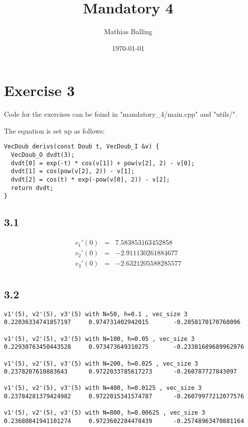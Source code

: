 \documentclass{article}
\title{Mandatory 4}
\author{Mathias Balling}
\date{\today}
\begin{document}
\maketitle

\section*{Exercise 3}
Code for the exercises can be foind in "mandatory\_4/main.cpp" and "utils/".

The equation is set up as follows:
\begin{verbatim}
VecDoub derivs(const Doub t, VecDoub_I &v) {
  VecDoub_O dvdt(3);
  dvdt[0] = exp(-t) * cos(v[1]) + pow(v[2], 2) - v[0];
  dvdt[1] = cos(pow(v[2], 2)) - v[1];
  dvdt[2] = cos(t) * exp(-pow(v[0], 2)) - v[2];
  return dvdt;
}
\end{verbatim}

\subsection*{3.1}
$$\begin{array}{rcl}
  v_1'(0)&=&7.583853163452858\\
  v_2'(0)&=&-2.911130261884677\\
  v_3'(0)&=&-2.6321205588285577\\
\end{array}$$

\subsection*{3.2}
\begin{verbatim}
v1'(5), v2'(5), v3'(5) with N=50, h=0.1 , vec_size 3
0.22036334741857197     0.974731402942015       -0.2058170170760096

v1'(5), v2'(5), v3'(5) with N=100, h=0.05 , vec_size 3
0.22930763450443528     0.973473649310275       -0.23381689689962976

v1'(5), v2'(5), v3'(5) with N=200, h=0.025 , vec_size 3
0.2378207610883643      0.9722033785617273      -0.260787727843097

v1'(5), v2'(5), v3'(5) with N=400, h=0.0125 , vec_size 3
0.23784281379424982     0.9722015341574787      -0.26079977212077576

v1'(5), v2'(5), v3'(5) with N=800, h=0.00625 , vec_size 3
0.23680841941101274     0.9723602284478439      -0.25748963470881164
\end{verbatim}
\newpage
\end{document}
